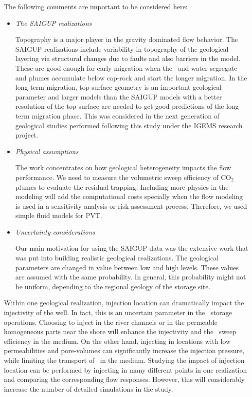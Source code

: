 {The following comments are important to be considered here:

\begin{itemize}

\item \textit{The SAIGUP realizations}
 
Topography is a major player in the gravity dominated flow behavior. The SAIGUP
realizations include variability in topography of the geological layering via
structural changes due to faults and also barriers in the model. These are good
enough for early migration when the \coo\ and water segregate and plumes
accumulate below cap-rock and start the longer migration. In the long-term
migration, top surface geometry is an important geological parameter and
larger models than the SAIGUP models with a better resolution of the top surface
are needed to get good predictions of the long-term migration phase. This
was considered in the next generation of geological studies performed following
this study \cite{syversveenstudy,nilsen2012impact} under the IGEMS research
project.

\item \textit{Physical assumptions}
 
The work concentrates on how geological heterogeneity impacts the flow
performance. We need to measure the volumetric sweep efficiency of $\mbox{CO}_2$
plumes to evaluate the residual trapping. Including more
physics in the modeling will add the computational costs specially when the flow
modeling is used in a sensitivity analysis or risk assessment process.
Therefore, we used simple fluid models for PVT. 

\item \textit{Uncertainty considerations}

Our main motivation for using the SAIGUP data was the extensive work that was put into building realistic geological realizations. The geological parameters are changed in value between low and high levels. These values are assumed with the same probability. In general, this probability might not be uniform, depending to the regional geology of the storage site. 

\end{itemize}
Within one geological realization, injection location can dramatically impact the injectivity of the well. In fact, this is an uncertain parameter in the \coo\ storage operations. Choosing to inject in the river channels or in the permeable homogeneous parts near the shore will enhance the injectivity and the \coo\ sweep efficiency in the medium. On the other hand, injecting in locations with low permeabilities and pore-volumes can significantly increase the injection pressure, while limiting the transport of \coo\ in the medium. Studying the impact of injection location can be performed by injecting in many different points in one realization and comparing the corresponding flow responses. However, this will considerably increase the number of detailed simulations in the study. 

}
